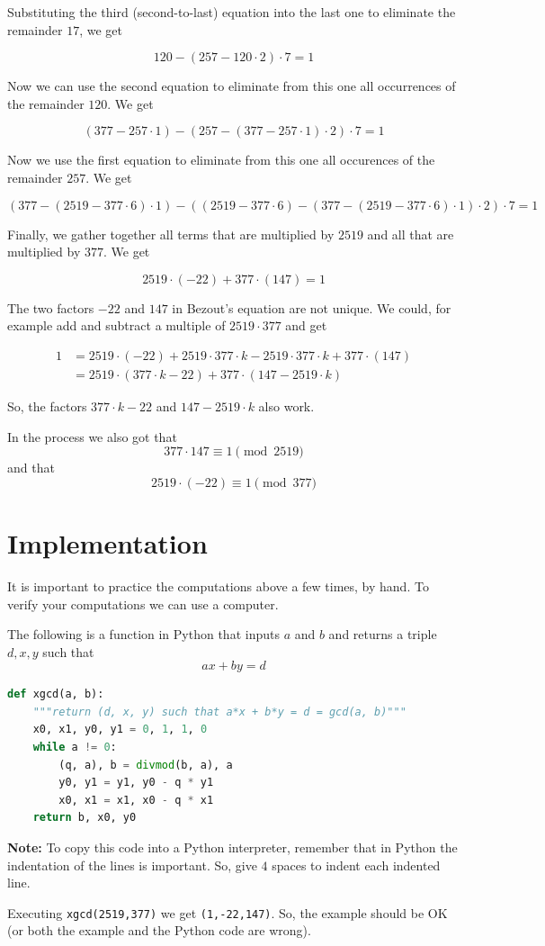 \documentclass{amsart}
\newcounter{lem}[section]\setcounter{lem}{0}
\begin{document}
Substituting the third (second-to-last) equation into the last one to eliminate the remainder $17$, we get 

$$120-(257-120\cdot 2)\cdot 7=\boxed{1}$$

Now we can use the second equation to eliminate from this one all occurrences of the remainder $120$. We get 

$$(377-257\cdot1)-(257-(377-257\cdot1)\cdot 2)\cdot 7=\boxed{1}$$

Now we use the first equation to eliminate from this one all occurences of the remainder $257$. We get

$$(377-(2519-377\cdot 6)\cdot1)-((2519-377\cdot 6)-(377-(2519-377\cdot 6)\cdot1)\cdot 2)\cdot 7=\boxed{1}$$

Finally, we gather together all terms that are multiplied by $2519$ and all that are multiplied by $377$. We get

$$2519\cdot (-22)+377\cdot (147) =\boxed{1}$$

The two factors $-22$ and $147$ in Bezout's equation are not unique. We could, for example add and subtract a multiple of $2519\cdot 377$ and get 

\begin{align*}\boxed{1}&=2519\cdot (-22)+2519\cdot377\cdot k-2519\cdot377\cdot k+377\cdot (147)\\
&=2519\cdot (377\cdot k-22)+377\cdot (147-2519\cdot k)
\end{align*}

So, the factors $377\cdot k-22$ and $147-2519\cdot k$ also work.

In the process we also got that $$377\cdot 147\equiv1\pmod{2519}$$
and that $$2519\cdot (-22)\equiv1\pmod{377}$$

\section*{Implementation}

It is important to practice the computations above a few times, by hand. 
To verify your computations we can use a computer.

The following is a function in Python that inputs $a$ and $b$ and returns a triple $d,x,y$ such that $$ax+by=d$$

\begin{lstlisting}[language=Python]
def xgcd(a, b):
    """return (d, x, y) such that a*x + b*y = d = gcd(a, b)"""
    x0, x1, y0, y1 = 0, 1, 1, 0
    while a != 0:
        (q, a), b = divmod(b, a), a
        y0, y1 = y1, y0 - q * y1
        x0, x1 = x1, x0 - q * x1
    return b, x0, y0
\end{lstlisting}

\noindent\textbf{Note:} To copy this code into a Python interpreter, remember that in Python the indentation of the lines is important. So, give $4$ spaces to indent each indented line.

Executing \lstinline{xgcd(2519,377)} we get \lstinline{(1,-22,147)}. So, the example should be OK (or both the example and the Python code are wrong).
\end{document}

